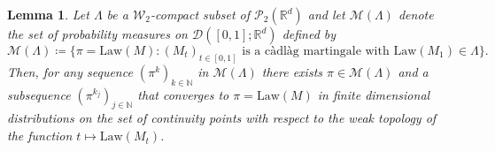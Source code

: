 \documentclass[12pt,oneside]{amsart}
\newtheorem{lemma}[theorem]{Lemma}
\theoremstyle{definition}
\newcommand{\Law}{\mathrm{Law}}
\newcommand{\W}{\mathcal W}
\newcommand{\N}{\mathbb N}
\newcommand{\R}{\mathbb R}
\def\R{{\mathbb R}}
\numberwithin{equation}{section}
\begin{document}
\begin{lemma}\label{lem:cpct-continuity-points}
    Let $\Lambda$ be a $\W_2$-compact subset of $\mathcal P_2(\R^d)$ and let $\mathcal M(\Lambda)$ denote the set of probability measures on $\mathcal D([0, 1]; \R^d)$ defined by
    \begin{equation} 
        \mathcal M(\Lambda) \coloneqq \{ \pi = \Law(M) \colon (M_t)_{t \in [0, 1]} \text{ is a c\`adl\`ag martingale with }\Law(M_1) \in \Lambda \}.
    \end{equation}
    Then, for any sequence $(\pi^k)_{k \in \N}$ in $\mathcal M(\Lambda)$ there exists $\pi \in \mathcal M(\Lambda)$ and a subsequence $(\pi^{k_j})_{j \in \N}$ that converges to $\pi = \Law(M)$ in finite dimensional distributions on the set of continuity points with respect to the weak topology of the function $t \mapsto \Law(M_t)$.
\end{lemma}
\end{document}

